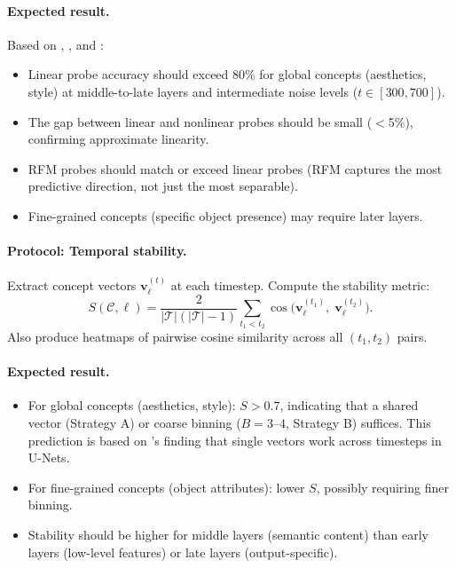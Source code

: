 \documentclass[11pt]{article}
\newcommand{\bv}{\mathbf{v}}
\begin{document}
\paragraph{Expected result.}
Based on \citet{conceptattention2025}, \citet{chen2023scene}, and \citet{baranchuk2022label}:
\begin{itemize}[leftmargin=*]
    \item Linear probe accuracy should exceed 80\% for global concepts (aesthetics, style) at middle-to-late layers and intermediate noise levels ($t \in [300, 700]$).
    \item The gap between linear and nonlinear probes should be small ($<$5\%), confirming approximate linearity.
    \item RFM probes should match or exceed linear probes (RFM captures the most predictive direction, not just the most separable).
    \item Fine-grained concepts (specific object presence) may require later layers.
\end{itemize}

\paragraph{Protocol: Temporal stability.}
Extract concept vectors $\bv_\ell^{(t)}$ at each timestep.
Compute the stability metric:
\begin{equation}
    S(\mathcal{C}, \ell) = \frac{2}{|\mathcal{T}|(|\mathcal{T}|-1)} \sum_{t_1 < t_2} \cos\bigl(\bv_\ell^{(t_1)},\; \bv_\ell^{(t_2)}\bigr).
    \label{eq:stability}
\end{equation}
Also produce heatmaps of pairwise cosine similarity across all $(t_1, t_2)$ pairs.

\paragraph{Expected result.}
\begin{itemize}[leftmargin=*]
    \item For global concepts (aesthetics, style): $S > 0.7$, indicating that a shared vector (Strategy A) or coarse binning ($B = 3$--$4$, Strategy B) suffices.
    This prediction is based on \citet{li2024selfdiscovering}'s finding that single vectors work across timesteps in U-Nets.
    \item For fine-grained concepts (object attributes): lower $S$, possibly requiring finer binning.
    \item Stability should be higher for middle layers (semantic content) than early layers (low-level features) or late layers (output-specific).
\end{itemize}
\end{document}
